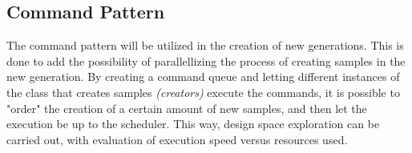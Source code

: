 \subsection{Command Pattern}
The command pattern will be utilized in the creation of new generations. This is done to add the possibility of parallellizing the process of creating samples in the new generation. By creating a command queue and letting different instances of the class that creates samples \textit{(creators)} execute the commands, it is possible to "order" the creation of a certain amount of new samples, and then let the execution be up to the scheduler. This way, design space exploration can be carried out, with evaluation of execution speed versus resources used.